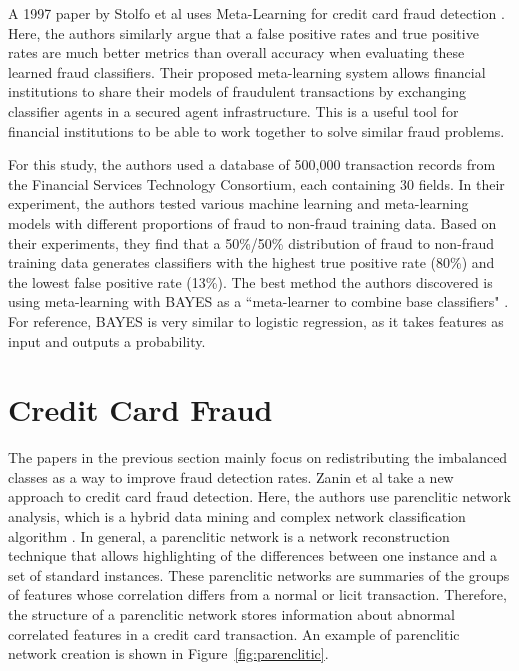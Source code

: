 \documentclass[midd]{thesis}
\begin{document}
A 1997 paper by Stolfo et al uses Meta-Learning for credit card fraud detection \cite{Stolfo1997}. Here, the authors similarly argue that a false positive rates and true positive rates are much better metrics than overall accuracy when evaluating these learned fraud classifiers. Their proposed meta-learning system allows financial institutions to share their models of fraudulent transactions by exchanging classifier agents in a secured agent infrastructure. This is a useful tool for financial institutions to be able to work together to solve similar fraud problems. 


For this study, the authors used a database of 500,000 transaction records from the Financial Services Technology Consortium, each containing 30 fields. In their experiment, the authors tested various machine learning and meta-learning models with different proportions of fraud to non-fraud training data. Based on their experiments, they find that a 50\%/50\% distribution of fraud to non-fraud training data generates classifiers with the highest true positive rate (80\%) and the lowest false positive rate (13\%). The best method the authors discovered is using meta-learning with BAYES as a ``meta-learner to combine base classifiers" \cite{Stolfo1997}. For reference, BAYES is very similar to logistic regression, as it takes features as input and outputs a probability.

\section{Credit Card Fraud}

The papers in the previous section mainly focus on redistributing the imbalanced classes as a way to improve fraud detection rates. Zanin et al take a new approach to credit card fraud detection. Here, the authors use parenclitic network analysis, which is a hybrid data mining and complex network classification algorithm \cite{Zanin2018}. In general, a parenclitic network is a network reconstruction technique that allows highlighting of the differences between one instance and a set of standard instances. These parenclitic networks are summaries of the groups of features whose correlation differs from a normal or licit transaction. Therefore, the structure of a parenclitic network stores information about abnormal correlated features in a credit card transaction. An example of parenclitic network creation is shown in Figure~\ref{fig:parenclitic}. 
\end{document}
